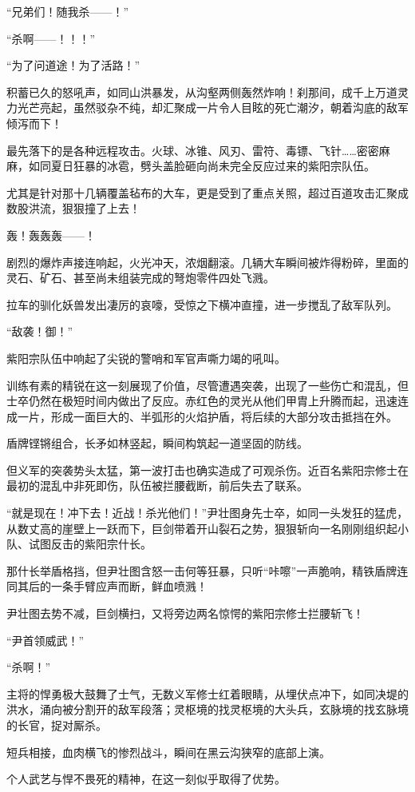 “兄弟们！随我杀——！”

“杀啊——！！！”

“为了问道途！为了活路！”

积蓄已久的怒吼声，如同山洪暴发，从沟壑两侧轰然炸响！刹那间，成千上万道灵力光芒亮起，虽然驳杂不纯，却汇聚成一片令人目眩的死亡潮汐，朝着沟底的敌军倾泻而下！

最先落下的是各种远程攻击。火球、冰锥、风刃、雷符、毒镖、飞针……密密麻麻，如同夏日狂暴的冰雹，劈头盖脸砸向尚未完全反应过来的紫阳宗队伍。

尤其是针对那十几辆覆盖毡布的大车，更是受到了重点关照，超过百道攻击汇聚成数股洪流，狠狠撞了上去！

轰！轰轰轰——！

剧烈的爆炸声接连响起，火光冲天，浓烟翻滚。几辆大车瞬间被炸得粉碎，里面的灵石、矿石、甚至尚未组装完成的弩炮零件四处飞溅。

拉车的驯化妖兽发出凄厉的哀嚎，受惊之下横冲直撞，进一步搅乱了敌军队列。

“敌袭！御！”

紫阳宗队伍中响起了尖锐的警哨和军官声嘶力竭的吼叫。

训练有素的精锐在这一刻展现了价值，尽管遭遇突袭，出现了一些伤亡和混乱，但士卒仍然在极短时间内做出了反应。赤红色的灵光从他们甲胄上升腾而起，迅速连成一片，形成一面巨大的、半弧形的火焰护盾，将后续的大部分攻击抵挡在外。

盾牌铿锵组合，长矛如林竖起，瞬间构筑起一道坚固的防线。

但义军的突袭势头太猛，第一波打击也确实造成了可观杀伤。近百名紫阳宗修士在最初的混乱中非死即伤，队伍被拦腰截断，前后失去了联系。

“就是现在！冲下去！近战！杀光他们！”尹壮图身先士卒，如同一头发狂的猛虎，从数丈高的崖壁上一跃而下，巨剑带着开山裂石之势，狠狠斩向一名刚刚组织起小队、试图反击的紫阳宗什长。

那什长举盾格挡，但尹壮图含怒一击何等狂暴，只听“咔嚓”一声脆响，精铁盾牌连同其后的一条手臂应声而断，鲜血喷溅！

尹壮图去势不减，巨剑横扫，又将旁边两名惊愕的紫阳宗修士拦腰斩飞！

“尹首领威武！”

“杀啊！”

主将的悍勇极大鼓舞了士气，无数义军修士红着眼睛，从埋伏点冲下，如同决堤的洪水，涌向被分割开的敌军段落；灵枢境的找灵枢境的大头兵，玄脉境的找玄脉境的长官，捉对厮杀。

短兵相接，血肉横飞的惨烈战斗，瞬间在黑云沟狭窄的底部上演。

个人武艺与悍不畏死的精神，在这一刻似乎取得了优势。

